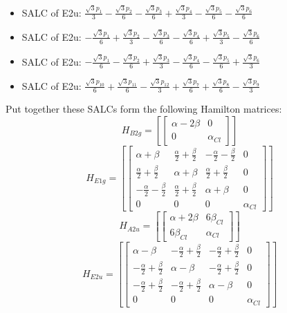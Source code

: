 \documentclass[12pt,a4paper]{article}
\begin{document}
\begin{itemize}
\item SALC of E2u: \quad $\frac{\sqrt{3} p_{1}}{3} - \frac{\sqrt{3} p_{2}}{6} - \frac{\sqrt{3} p_{3}}{6} + \frac{\sqrt{3} p_{4}}{3} - \frac{\sqrt{3} p_{5}}{6} - \frac{\sqrt{3} p_{6}}{6}$
\item SALC of E2u: \quad $- \frac{\sqrt{3} p_{1}}{6} + \frac{\sqrt{3} p_{2}}{3} - \frac{\sqrt{3} p_{3}}{6} - \frac{\sqrt{3} p_{4}}{6} + \frac{\sqrt{3} p_{5}}{3} - \frac{\sqrt{3} p_{6}}{6}$
\item SALC of E2u: \quad $- \frac{\sqrt{3} p_{1}}{6} - \frac{\sqrt{3} p_{2}}{6} + \frac{\sqrt{3} p_{3}}{3} - \frac{\sqrt{3} p_{4}}{6} - \frac{\sqrt{3} p_{5}}{6} + \frac{\sqrt{3} p_{6}}{3}$
\item SALC of E2u: \quad $\frac{\sqrt{3} p_{10}}{6} + \frac{\sqrt{3} p_{11}}{6} - \frac{\sqrt{3} p_{12}}{3} + \frac{\sqrt{3} p_{7}}{6} + \frac{\sqrt{3} p_{8}}{6} - \frac{\sqrt{3} p_{9}}{3}$
\end{itemize}
Put together these SALCs form the following Hamilton matrices:
     $$ H_{B2g}= \left[\begin{bmatrix}\alpha - 2 \beta & 0\\0 & \alpha_{Cl}\end{bmatrix}\right]$$ 
     $$ H_{E1g}= \left[\begin{bmatrix}\alpha + \beta & \frac{\alpha}{2} + \frac{\beta}{2} & - \frac{\alpha}{2} - \frac{\beta}{2} & 0\\\frac{\alpha}{2} + \frac{\beta}{2} & \alpha + \beta & \frac{\alpha}{2} + \frac{\beta}{2} & 0\\- \frac{\alpha}{2} - \frac{\beta}{2} & \frac{\alpha}{2} + \frac{\beta}{2} & \alpha + \beta & 0\\0 & 0 & 0 & \alpha_{Cl}\end{bmatrix}\right]$$ 
     $$ H_{A2u}= \left[\begin{bmatrix}\alpha + 2 \beta & 6 \beta_{Cl}\\6 \beta_{Cl} & \alpha_{Cl}\end{bmatrix}\right]$$ 
     $$ H_{E2u}= \left[\begin{bmatrix}\alpha - \beta & - \frac{\alpha}{2} + \frac{\beta}{2} & - \frac{\alpha}{2} + \frac{\beta}{2} & 0\\- \frac{\alpha}{2} + \frac{\beta}{2} & \alpha - \beta & - \frac{\alpha}{2} + \frac{\beta}{2} & 0\\- \frac{\alpha}{2} + \frac{\beta}{2} & - \frac{\alpha}{2} + \frac{\beta}{2} & \alpha - \beta & 0\\0 & 0 & 0 & \alpha_{Cl}\end{bmatrix}\right]$$ 
\end{document}
